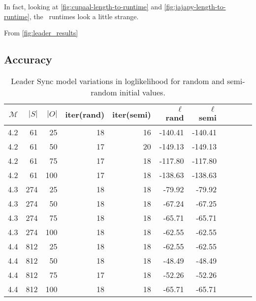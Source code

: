 In fact, looking at \autoref{fig:cupaal-length-to-runtime} and \autoref{fig:jajapy-length-to-runtime}, the \Cupaal\ runtimes look a little strange.






From \autoref{fig:leader_results}




\subsection{Accuracy}\label{subsec:accuracy}
\begin{table}[htb!]
    \centering
    \caption{Leader Sync model variations in loglikelihood for random and semi-random initial values.}
    \label{tab:leader_results_loglikelihood}
    \begin{tabular}{rrrrrrrrrrr}
        \toprule
        $\mathcal{M}$ & $|S|$ & $|O|$ & iter(rand) & iter(semi) & $\ell$ rand & $\ell$ semi \\
        \midrule
        4.2           & 61    & 25    & 18         & 16         & -140.41     & -140.41     \\
        4.2           & 61    & 50    & 17         & 20         & -149.13     & -149.13     \\
        4.2           & 61    & 75    & 17         & 18         & -117.80     & -117.80     \\
        4.2           & 61    & 100   & 17         & 18         & -138.63     & -138.63     \\
        4.3           & 274   & 25    & 18         & 18         & -79.92      & -79.92      \\
        4.3           & 274   & 50    & 18         & 18         & -67.24      & -67.25      \\
        4.3           & 274   & 75    & 18         & 18         & -65.71      & -65.71      \\
        4.3           & 274   & 100   & 18         & 18         & -62.55      & -62.55      \\
        4.4           & 812   & 25    & 18         & 18         & -62.55      & -62.55      \\
        4.4           & 812   & 50    & 18         & 18         & -48.49      & -48.49      \\
        4.4           & 812   & 75    & 17         & 18         & -52.26      & -52.26      \\
        4.4           & 812   & 100   & 18         & 18         & -65.71      & -65.71      \\
        \bottomrule
    \end{tabular}
\end{table}

